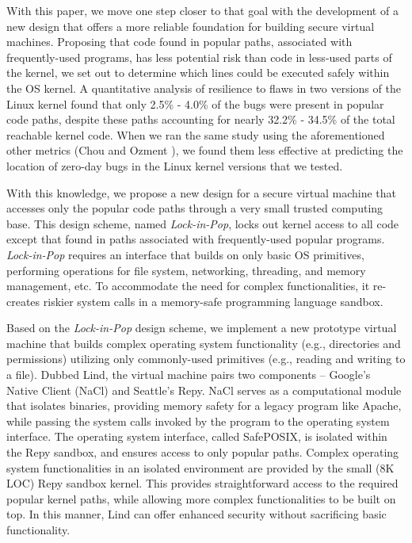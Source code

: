 With this paper, we move one step closer to that goal with the development
of a new design that offers a more reliable foundation for building secure virtual machines.
Proposing that code found in popular paths, associated with frequently-used programs,
has less potential risk than code in less-used parts of the kernel, we set out to determine
which lines could be executed safely within the OS kernel.
A quantitative analysis of resilience to flaws in two versions of the Linux kernel
found that only 2.5\% - 4.0\% of the bugs were present in popular code paths,
despite these paths accounting for nearly 32.2\% - 34.5\% of the total reachable kernel code.
When we ran the same study using the aforementioned other metrics
(Chou \cite{PittSFIeld} and Ozment \cite{ozment2006milk}),
we found them less effective at predicting the location of zero-day bugs in the
Linux kernel versions that we tested.

With this knowledge, we propose a new design for a secure virtual machine that
accesses only the popular code paths through a very small trusted computing base.
This design scheme, named \emph{Lock-in-Pop}, locks out kernel access to all code except
that found in paths associated with frequently-used popular programs. \emph{Lock-in-Pop} requires an interface
that builds on only basic OS primitives, performing operations for file system,
networking, threading, and memory management, etc.
To accommodate the need for complex functionalities, it re-creates riskier system calls in
a memory-safe programming language sandbox.

Based on the \emph{Lock-in-Pop} design scheme, we implement a new prototype virtual
 machine that builds complex operating system functionality (e.g., directories and
 permissions) utilizing only commonly-used primitives (e.g., reading and writing to a file).
Dubbed Lind, the virtual machine pairs two components -- Google's Native Client
(NaCl) and Seattle's Repy.
NaCl serves as a computational module that isolates binaries, providing memory
safety for a legacy program like Apache,
while passing the system calls invoked by the  program to the operating system interface.
The operating system interface, called SafePOSIX, is isolated within the Repy
sandbox, and ensures access to only popular paths.
Complex operating system functionalities in an isolated environment are
provided by the small (8K LOC) Repy sandbox kernel.
This provides straightforward access to the required popular kernel paths,
while allowing more complex functionalities to be built on top.
In this manner, Lind can offer enhanced security without sacrificing basic functionality.

